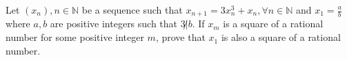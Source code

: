 Let $(x_n), n\in\mathbb{N}$ be a sequence such that $x_{n+1}=3x_n^3+x_n, \forall n\in\mathbb{N}$
and $x_1=\frac{a}{b}$ where $a,b$ are positive integers such that $3\not|b$. If $x_m$ is a square of a rational number for some positive integer $m$, prove that $x_1$ is also a square of a rational number.